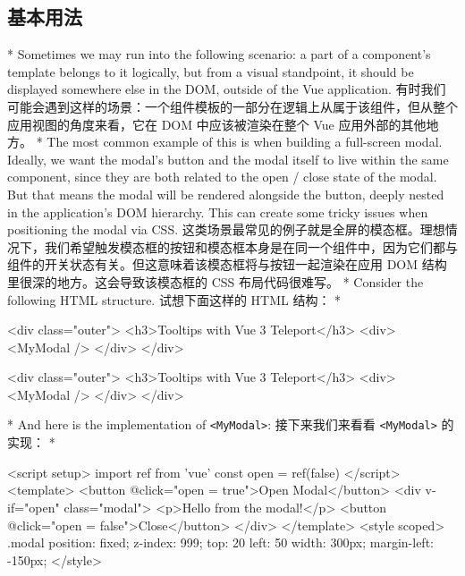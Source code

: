 \begin{paracol}{2}
\subsection{基本用法}
\switchcolumn[0]*%
Sometimes we may run into the following scenario: a part of a
component's template belongs to it logically, but from a visual
standpoint, it should be displayed somewhere else in the DOM, outside of
the Vue application.
\switchcolumn
有时我们可能会遇到这样的场景：一个组件模板的一部分在逻辑上从属于该组件，但从整个应用视图的角度来看，它在
DOM 中应该被渲染在整个 Vue 应用外部的其他地方。
\switchcolumn[0]*%
The most common example of this is when building a full-screen modal.
Ideally, we want the modal's button and the modal itself to live within
the same component, since they are both related to the open / close
state of the modal. But that means the modal will be rendered alongside
the button, deeply nested in the application's DOM hierarchy. This can
create some tricky issues when positioning the modal via CSS.
\switchcolumn
这类场景最常见的例子就是全屏的模态框。理想情况下，我们希望触发模态框的按钮和模态框本身是在同一个组件中，因为它们都与组件的开关状态有关。但这意味着该模态框将与按钮一起渲染在应用
DOM 结构里很深的地方。这会导致该模态框的 CSS 布局代码很难写。
\switchcolumn[0]*%
Consider the following HTML structure.
\switchcolumn
试想下面这样的 HTML 结构：
\switchcolumn[0]*%
\begin{codeHtml}
<div class="outer">
  <h3>Tooltips with Vue 3 Teleport</h3>
  <div>
    <MyModal />
  </div>
</div>
\end{codeHtml}
\switchcolumn
\begin{codeHtml}
<div class="outer">
  <h3>Tooltips with Vue 3 Teleport</h3>
  <div>
    <MyModal />
  </div>
</div>
\end{codeHtml}
\switchcolumn[0]*%
And here is the implementation of
\texttt{\textless{}MyModal\textgreater{}}:
\switchcolumn
接下来我们来看看 \texttt{\textless{}MyModal\textgreater{}} 的实现：
\switchcolumn[0]*%
\begin{codeHtml}
<script setup>
import { ref } from 'vue'
const open = ref(false)
</script>
<template>
  <button @click="open = true">Open Modal</button>
  <div v-if="open" class="modal">
    <p>Hello from the modal!</p>
    <button @click="open = false">Close</button>
  </div>
</template>
<style scoped>
.modal {
  position: fixed;
  z-index: 999;
  top: 20%
  left: 50%
  width: 300px;
  margin-left: -150px;
}
</style>
\end{codeHtml}
\switchcolumn
\begin{codeHtml}

\end{codeHtml}
\end{paracol}
